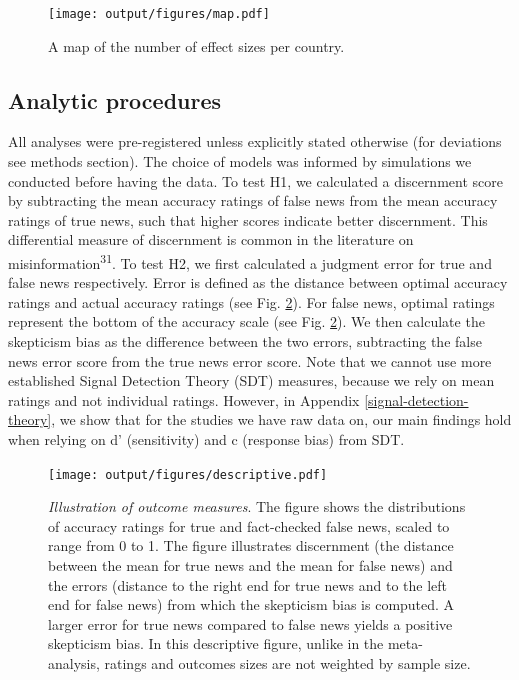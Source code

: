 \documentclass[
  man]{apa6}
\begin{document}
\begin{figure}
\centering
\texttt{[image: output/figures/map.pdf]}
\caption{\label{fig:map}A map of the number of effect sizes per country.}
\end{figure}

\subsection{Analytic procedures}\label{analytic-procedures}

All analyses were pre-registered unless explicitly stated otherwise (for deviations see methods section). The choice of models was informed by simulations we conducted before having the data. To test H1, we calculated a discernment score by subtracting the mean accuracy ratings of false news from the mean accuracy ratings of true news, such that higher scores indicate better discernment. This differential measure of discernment is common in the literature on misinformation\textsuperscript{31}. To test H2, we first calculated a judgment error for true and false news respectively. Error is defined as the distance between optimal accuracy ratings and actual accuracy ratings (see Fig. \ref{fig:descriptive}). For false news, optimal ratings represent the bottom of the accuracy scale (see Fig. \ref{fig:descriptive}). We then calculate the skepticism bias as the difference between the two errors, subtracting the false news error score from the true news error score. Note that we cannot use more established Signal Detection Theory (SDT) measures, because we rely on mean ratings and not individual ratings. However, in Appendix \ref{signal-detection-theory}, we show that for the studies we have raw data on, our main findings hold when relying on d' (sensitivity) and c (response bias) from SDT.



\begin{figure}
\centering
\texttt{[image: output/figures/descriptive.pdf]}
\caption{\label{fig:descriptive}\emph{Illustration of outcome measures}. The figure shows the distributions of accuracy ratings for true and fact-checked false news, scaled to range from 0 to 1. The figure illustrates discernment (the distance between the mean for true news and the mean for false news) and the errors (distance to the right end for true news and to the left end for false news) from which the skepticism bias is computed. A larger error for true news compared to false news yields a positive skepticism bias. In this descriptive figure, unlike in the meta-analysis, ratings and outcomes sizes are not weighted by sample size.}
\end{figure}
\end{document}
